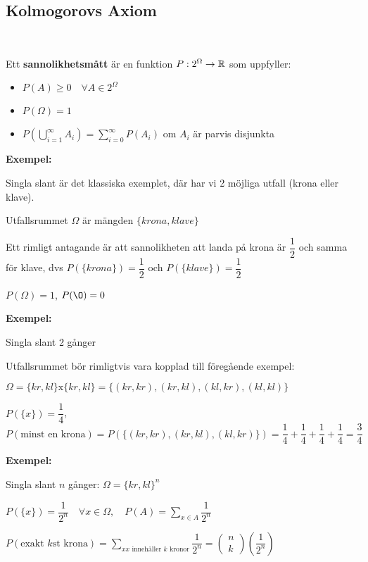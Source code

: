 \subsection{Kolmogorovs Axiom}\hfill\\
\par
Ett \textbf{sannolikhetsmått} är en funktion $P:2^{\Omega}\to\mathbb{R}$ som uppfyller:
\begin{itemize}
  \item $P(A)\geq0\quad \forall A\in2^{\Omega}$
  \item $P(\Omega) = 1$
  \item $P\left(\bigcup_{i=1}^{\infty}A_i\right) = \sum_{i=0}^{\infty}P(A_i)$ om $A_i$ är parvis disjunkta
\end{itemize}
\par\bigskip
\noindent\textbf{Exempel:}
\par\bigskip
\noindent Singla slant är det klassiska exemplet, där har vi 2 möjliga utfall (krona eller klave).\par
\noindent Utfallsrummet $\Omega$ är mängden $\{krona, klave\}$\par
\noindent Ett rimligt antagande är att sannolikheten att landa på krona är $\dfrac{1}{2}$ och samma för klave, dvs $P(\{krona\}) = \dfrac{1}{2}$ och $P(\{klave\}) = \dfrac{1}{2}$\par\bigskip
\noindent $P(\Omega) = 1$, $P(\O) = 0$
\par\bigskip
\noindent\textbf{Exempel:}
\par\bigskip
\noindent Singla slant 2 gånger\par
\noindent Utfallsrummet bör rimligtvis vara kopplad till föregående exempel:
\par\bigskip
\noindent$\Omega = \{kr,kl\}\text{x}\{kr,kl\} = \{(kr,kr),(kr,kl),(kl,kr),(kl,kl)\}$
\par\bigskip
\noindent $P(\{x\})=\dfrac{1}{4}$, $P(\text{minst en krona}) = P\left(\{(kr,kr),(kr,kl),(kl,kr)\}\right) = \dfrac{1}{4}+\dfrac{1}{4}+\dfrac{1}{4}+\dfrac{1}{4}=\dfrac{3}{4}$
\par\bigskip
\noindent\textbf{Exempel:}
\par\bigskip
\noindent Singla slant $n$ gånger: $\Omega = \{kr,kl\}^n$\par
\noindent $P(\{x\}) = \dfrac{1}{2^n}\quad \forall x\in\Omega,\quad P(A) = \sum_{x\in A}\dfrac{1}{2^n}$\par
\noindent $P(\text{exakt $k$st krona}) = \sum_{x\text{$x$ innehåller $k$ kronor}}\dfrac{1}{2^n} = \begin{pmatrix}n\\k\end{pmatrix}\left(\dfrac{1}{2^n}\right)$
